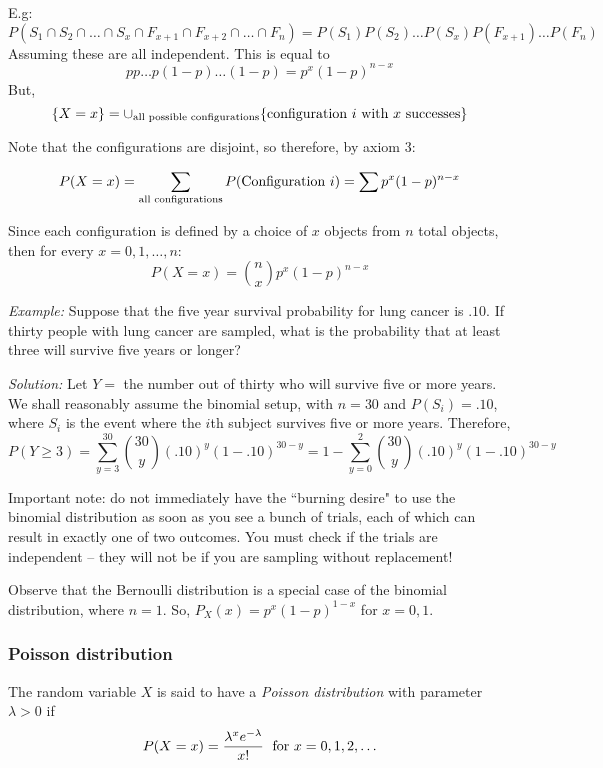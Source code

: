 \documentclass[12pt]{article}
\begin{document}
E.g:
\[ P(S_1 \cap S_2 \cap \ldots \cap S_x \cap F_{x+1} \cap F_{x+2} \cap \ldots \cap F_n) = P(S_1) P(S_2) \ldots P(S_x) P(F_{x+1}) \ldots P(F_n) \]
Assuming these are all independent. This is equal to
\[
    p p \ldots p (1-p) \ldots (1-p) = p^x (1-p)^{n-x}
\]
But,
\[
    \{ X = x \} = \cup_{\textnormal{all possible configurations}} \{ \textnormal{configuration $i$ with $x$ successes} \}
\]

Note that the configurations are disjoint, so therefore, by axiom 3:

\[
    P(X = x) = \sum_{\textnormal{all configurations}} P(\textnormal{Configuration } i) = \sum p^x (1-p)^{n-x}
\]

Since each configuration is defined by a choice of $x$ objects from $n$ total objects, then for every $x = 0, 1, \ldots, n$:
\[
    P (X = x) = {n \choose x} p^x (1-p)^{n-x}
\]

\emph{Example:} Suppose that the five year survival probability for lung cancer is $.10$. If thirty people with lung cancer are sampled, what is the probability that at least three will survive five years or longer?

\emph{Solution:} Let $Y =$ the number out of thirty who will survive five or more years. We shall reasonably assume the binomial setup, with $n = 30$ and $P(S_i) = .10$, where $S_i$ is the event where the $i$th subject survives five or more years. Therefore,
\[
    P(Y \geq 3) = \sum_{y=3}^{30} {30 \choose y} (.10)^y (1-.10)^{30-y} = 1 - \sum_{y=0}^{2} {30 \choose y} (.10)^y (1-.10)^{30-y}
\]

Important note: do not immediately have the ``burning desire" to use the binomial distribution as soon as you see a bunch of trials, each of which can result in exactly one of two outcomes. You must check if the trials are independent -- they will not be if you are sampling without replacement!

Observe that the Bernoulli distribution is a special case of the binomial distribution, where $n = 1$. So, $P_X (x) = p^x (1-p)^{1-x}$ for $x = 0,1$.


\subsubsection{Poisson distribution}

The random variable $X$ is said to have a \emph{Poisson distribution} with parameter $\lambda > 0$ if
\[
    P(X = x) = \frac{ \lambda^x e^{- \lambda}}{x!} \; \textnormal{ for } x = 0,1,2,\ldots
\]
\end{document}
